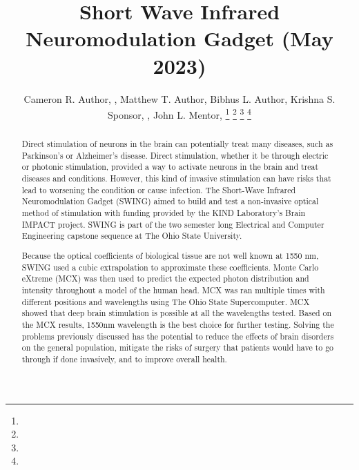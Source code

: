 \documentclass[journal,twoside,web]{ieeecolor}
\begin{document}
\title{Short Wave Infrared Neuromodulation Gadget (May 2023)}
\author{Cameron R. Author, , Matthew T. Author, Bibhus L. Author, 
        Krishna S. Sponsor, , John L. Mentor, 
\thanks{ }
\thanks{ }
\thanks{ }
\thanks{ }}

\maketitle

\begin{abstract}
    Direct stimulation of neurons in the brain can potentially treat many diseases, such as Parkinson's  
    or Alzheimer's disease. Direct stimulation, whether it be through electric or photonic stimulation,  
    provided a way to activate neurons in the brain and treat diseases and conditions. However, this kind  
    of invasive stimulation can have risks that lead to worsening the condition or cause infection.  
    The Short-Wave Infrared Neuromodulation Gadget (SWING) aimed to build and test a non-invasive optical method  
    of stimulation with funding provided by the KIND Laboratory's Brain IMPACT project. SWING is part of the  
    two semester long Electrical and Computer Engineering capstone sequence at The Ohio State University. 
    
    Because the optical coefficients of biological tissue are not well known at 1550 nm,  
    SWING used a cubic extrapolation to approximate these coefficients. Monte Carlo eXtreme (MCX) was then used to predict the  
    expected photon distribution and intensity throughout a model of the human head. MCX was ran multiple times with different positions 
    and wavelengths using The Ohio State Supercomputer. MCX showed that deep brain stimulation is possible at all the wavelengths tested. 
    Based on the MCX results, 1550nm wavelength is the best choice for further testing. Solving the problems previously discussed has the 
    potential to reduce the effects of brain disorders on the general population, mitigate the risks of surgery that patients would have to 
    go through if done invasively, and to improve overall health. 
\end{abstract}

\begin{IEEEkeywords}

\end{IEEEkeywords}
\end{document}
